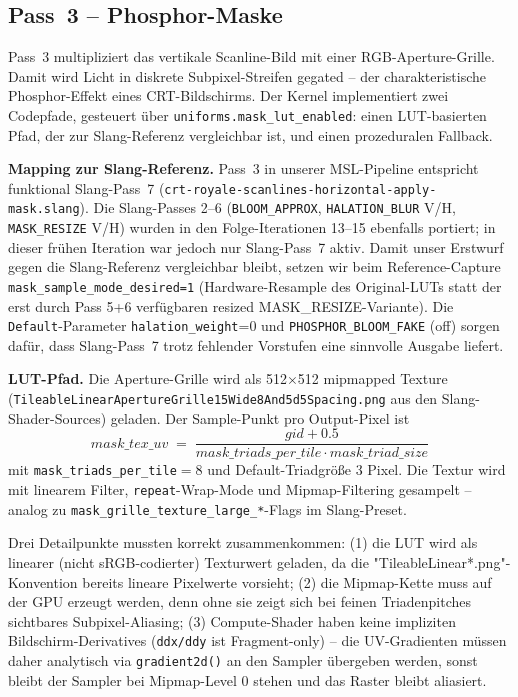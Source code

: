 \documentclass[11pt, a4paper]{article}
\begin{document}
\vspace{.5cm}
\subsection{Pass~3 -- Phosphor-Maske}
\vspace{.5cm}
Pass~3 multipliziert das vertikale Scanline-Bild mit einer RGB-Aperture-Grille. Damit wird Licht in diskrete Subpixel-Streifen gegated -- der charakteristische Phosphor-Effekt eines CRT-Bildschirms. Der Kernel implementiert zwei Codepfade, gesteuert \"uber \texttt{uniforms.mask\_lut\_enabled}: einen LUT-basierten Pfad, der zur Slang-Referenz vergleichbar ist, und einen prozeduralen Fallback.

\vspace{.5cm}
\textbf{Mapping zur Slang-Referenz.} Pass~3 in unserer MSL-Pipeline entspricht funktional Slang-Pass~7 (\texttt{crt-royale-scanlines-horizontal-apply-mask.slang}). Die Slang-Passes 2--6 (\texttt{BLOOM\_APPROX}, \texttt{HALATION\_BLUR} V/H, \texttt{MASK\_RESIZE} V/H) wurden in den Folge-Iterationen 13--15 ebenfalls portiert; in dieser fr\"uhen Iteration war jedoch nur Slang-Pass~7 aktiv. Damit unser Erstwurf gegen die Slang-Referenz vergleichbar bleibt, setzen wir beim Reference-Capture \texttt{mask\_sample\_mode\_desired=1} (Hardware-Resample des Original-LUTs statt der erst durch Pass 5+6 verf\"ugbaren resized MASK\_RESIZE-Variante). Die \texttt{Default}-Parameter \texttt{halation\_weight}=0 und \texttt{PHOSPHOR\_BLOOM\_FAKE} (off) sorgen daf\"ur, dass Slang-Pass~7 trotz fehlender Vorstufen eine sinnvolle Ausgabe liefert.

\vspace{.5cm}
\textbf{LUT-Pfad.} Die Aperture-Grille wird als 512$\times$512 mipmapped Texture (\texttt{TileableLinearApertureGrille15Wide8And5d5Spacing.png} aus den Slang-Shader-Sources) geladen. Der Sample-Punkt pro Output-Pixel ist
\[
    \mathit{mask\_tex\_uv} \;=\; \frac{\mathit{gid} + 0.5}{\mathit{mask\_triads\_per\_tile} \cdot \mathit{mask\_triad\_size}}
\]
mit \texttt{mask\_triads\_per\_tile}$=8$ und Default-Triadgr\"o{\ss}e $3$ Pixel. Die Textur wird mit linearem Filter, \texttt{repeat}-Wrap-Mode und Mipmap-Filtering gesampelt -- analog zu \texttt{mask\_grille\_texture\_large\_*}-Flags im Slang-Preset.

Drei Detailpunkte mussten korrekt zusammenkommen: (1) die LUT wird als linearer (nicht sRGB-codierter) Texturwert geladen, da die "TileableLinear*.png"-Konvention bereits lineare Pixelwerte vorsieht; (2) die Mipmap-Kette muss auf der GPU erzeugt werden, denn ohne sie zeigt sich bei feinen Triadenpitches sichtbares Subpixel-Aliasing; (3) Compute-Shader haben keine impliziten Bildschirm-Derivatives (\verb|ddx/ddy| ist Fragment-only) -- die UV-Gradienten m\"ussen daher analytisch via \texttt{gradient2d()} an den Sampler übergeben werden, sonst bleibt der Sampler bei Mipmap-Level 0 stehen und das Raster bleibt aliasiert.
\end{document}
